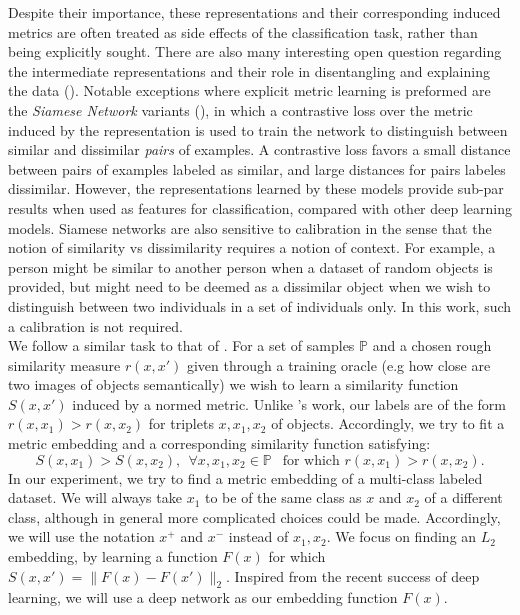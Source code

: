 \documentclass{article} %
\begin{document}
Despite their importance, these representations and their corresponding induced metrics are often  
treated as side effects of the  classification task, rather than being explicitly sought.
There are also many interesting open question regarding the intermediate representations and their role in disentangling and explaining the data (\citet{Bengio2013}).
Notable exceptions where explicit metric learning is preformed are the \emph{Siamese Network} variants (\citet{bromley1993signature,Chopra2005,hadsell2006dimensionality}), in which a contrastive loss over 
the metric induced by the representation  is used to train the network to distinguish between similar and dissimilar \emph{pairs} of examples.  A contrastive loss favors a small distance between pairs of examples
labeled as similar, and large distances for pairs labeles dissimilar.
However, the representations learned by these models provide sub-par results when used as features for classification, compared with other deep learning models. Siamese networks are also sensitive to calibration in the sense that the notion of similarity vs dissimilarity requires a notion of context.
For example, a person might be similar to another person when a dataset of random objects is provided, but might need to be deemed as a dissimilar object when we wish to distinguish between two individuals in a set of individuals only. %
In this work, such a calibration is not required.\\

We follow a similar task to that of \citet{chechik2010large}. For a set of samples $\mathbb{P}$ and a chosen rough similarity measure $r(x,x')$ given through a training oracle
(e.g how close are two images of objects semantically) we wish to learn a similarity function $S(x,x')$ induced by a normed metric.
Unlike  \citet{chechik2010large}'s work, our labels are of the form $r(x,x_1)>r(x,x_2)$ for triplets $x,x_1,x_2$ of objects.
Accordingly, we try to fit a metric embedding and a corresponding similarity function satisfying:
$$ S(x,x_1)>S(x,x_2), \ \ \forall x,x_1,x_2 \in \mathbb{P} \ \ \text{ for which } r(x,x_1)>r(x,x_2).$$
In our experiment, we try to find a metric embedding of a multi-class labeled dataset. We will always take $x_1$ to be of the same class as $x$ and $x_2$ of a different class, although in general more complicated choices could be made.
Accordingly, we will use the notation $x^{+}$ and $x^{-}$ instead of $x_1, x_2$.
We focus on finding an $L_2$ embedding, by learning a function $F(x)$ for which $S(x,x')=\|F(x)-F(x')\|_2$.
Inspired from the recent success of deep learning, we will use a deep network as our embedding function $F(x)$.
\end{document}
